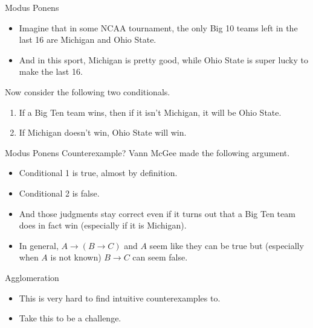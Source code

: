\documentclass[
  ignorenonframetext,
]{beamer}
\providecommand{\tightlist}{%
  \setlength{\itemsep}{0pt}\setlength{\parskip}{0pt}}
\renewcommand{\,}{\text{, }}
\begin{document}
\begin{frame}{Modus Ponens}
\protect\hypertarget{modus-ponens}{}
\begin{itemize}
\tightlist
\item
  Imagine that in some NCAA tournament, the only Big 10 teams left in
  the last 16 are Michigan and Ohio State.
\item
  And in this sport, Michigan is pretty good, while Ohio State is super
  lucky to make the last 16. \pause 
\end{itemize}

Now consider the following two conditionals.

\begin{enumerate}
\tightlist
\item
  If a Big Ten team wins, then if it isn't Michigan, it will be Ohio
  State.
\item
  If Michigan doesn't win, Ohio State will win.
\end{enumerate}
\end{frame}

\begin{frame}{Modus Ponens Counterexample?}
\protect\hypertarget{modus-ponens-counterexample}{}
Vann McGee made the following argument.

\begin{itemize}
\tightlist
\item
  Conditional 1 is true, almost by definition. \pause 
\item
  Conditional 2 is false. \pause 
\item
  And those judgments stay correct even if it turns out that a Big Ten
  team does in fact win (especially if it is Michigan). \pause 
\item
  In general, \(A \rightarrow (B \rightarrow C)\) and \(A\) seem like
  they can be true but (especially when \(A\) is not known)
  \(B \rightarrow C\) can seem false.
\end{itemize}
\end{frame}

\begin{frame}{Agglomeration}
\protect\hypertarget{agglomeration}{}
\begin{itemize}
\tightlist
\item
  This is very hard to find intuitive counterexamples to.
\item
  Take this to be a challenge.
\end{itemize}
\end{frame}
\end{document}
